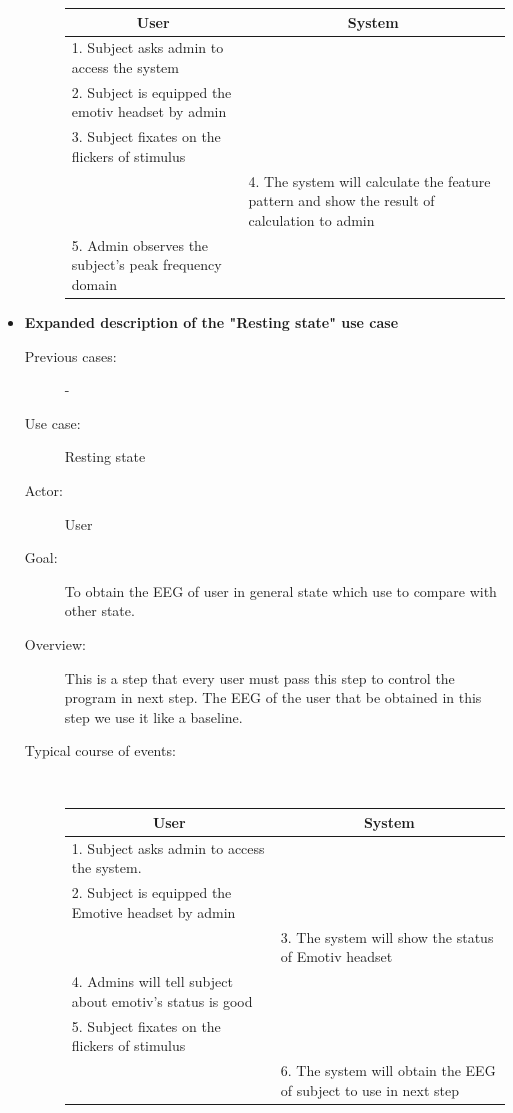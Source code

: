 \begin{itemize}
\begin{description}
	{
		\centering
		
		\begin{tabular}{| m{.47\linewidth} | m{.47\linewidth} |}
			
			\hline 
			\multicolumn{1}{|c}{\textbf{User}} & 
  			\multicolumn{1}{|c|}{\textbf{System}}\\
			\hline 
			1. Subject asks admin to access the system &   \\
			\hline 
			2. Subject is equipped the emotiv headset by admin  &   \\
			\hline 
			3. Subject fixates on the flickers of stimulus & \\
			\hline 
			& 4. The system will calculate the feature pattern and show the result of calculation to admin  \\
			\hline
			5. Admin observes the subject's peak frequency domain & \\
			\hline
			
		\end{tabular}
	}
	
\end{description}

\newpage
\item \textbf{Expanded description of the "Resting state" use case }
\begin{description}
	\item [Previous cases:] -
	\item [Use case:] Resting state
	\item [Actor:] User  
	\item [Goal:] To obtain the EEG of user in general state which use to compare with other state. 
	\item [Overview:] This is a step that every user must pass this step to control the program in next step. The EEG of the user that be obtained in this step we use it like a baseline. 
	\item [Typical course of events:]~
	
	{
		\centering
		\begin{tabular}{| m{.47\linewidth} | m{.47\linewidth} |}
			
			\hline 
			\multicolumn{1}{|c}{\textbf{User}} & 
  			\multicolumn{1}{|c|}{\textbf{System}}\\
			\hline 
			1. Subject asks admin to access the system. &   \\
			\hline 
			2. Subject is equipped the Emotive headset by admin   &   \\
			\hline 
			& 3. The system will show the status of Emotiv headset \\
			\hline 
			4. Admins will tell subject about emotiv's status is good &  \\
			\hline
			5. Subject fixates on the flickers of stimulus &  \\
			\hline
			& 6. The system will obtain the EEG of subject to use in next step\\
			\hline
			

\end{tabular}}
\end{description}
\end{itemize}
